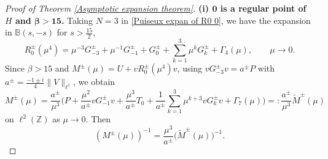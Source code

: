 \documentclass[reqno, 11pt]{amsart}
\newcommand\Z{\mathbb{Z}}
\newcommand\B{\mathbb{B}}
\numberwithin{equation}{section}
\begin{document}
\begin{proof}[Proof of Theorem {\rm\ref{Asymptotic expansion theorem}}]{\bf{(i) ${\bm{0}}$ is a regular point of $H$ and {$\bm{\beta>15}$}.}}
Taking $N=3$ in \eqref{Puiseux expan of R0 0}, we have the expansion in $\B(s,-s)$ for $s>\frac{15}{2}$,
\begin{equation*}
R^{\pm}_0(\mu^4)=\mu^{-3}G^{\pm}_{-3}+\mu^{-1}G^{\pm}_{-1}+G^{\pm}_0+\sum\limits_{k=1}^{3}\mu^kG^{\pm}_{k}+\Gamma_4(\mu),\qquad \mu \rightarrow0.
\end{equation*}
Since $\beta>15$ and $M^{\pm}(\mu)=U+vR^{\pm}_0(\mu^4)v$, using $vG^{\pm}_{-3}v=a^{\pm}P$ with $a^{\pm}=\frac{-1\pm i}{4}\|V\|_{\ell^1}$, we obtain 
 \begin{equation*}
 M^{\pm}(\mu)=\frac{a^{\pm}}{\mu^3}\Big(P+\frac{\mu^2}{a^{\pm}}vG^{\pm}_{-1}v+\frac{\mu^3}{a^{\pm}}T_0+\frac{1}{a^{\pm}}\sum\limits_{k=1}^{3}\mu^{k+3}vG^{\pm}_{k}v+\Gamma_7(\mu)\Big)=:\frac{a^{\pm}}{\mu^3}\widetilde{M}^{\pm}(\mu)
 \end{equation*}
 on $\ell^2(\Z)$ as $\mu\rightarrow0$. Then
\begin{equation}\label{Relat of M and M tuta} \left(M^{\pm}(\mu)\right)^{-1}=\frac{\mu^3}{a^{\pm}}\big(\widetilde{M}^{\pm}(\mu)\big)^{-1}.
\end{equation}


\end{proof}
\end{document}
